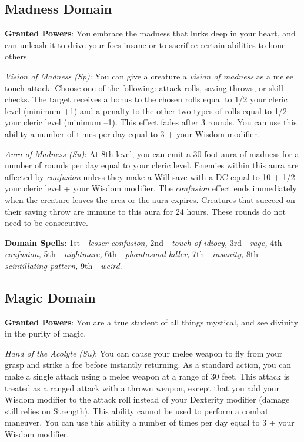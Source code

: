 \subsection{Madness Domain}

				
\textbf{Granted Powers}: You embrace the madness that lurks deep in your heart, and can unleash it to drive your foes insane or to sacrifice certain abilities to hone others.
				
\textit{Vision of Madness (Sp)}: You can give a creature a \textit{vision of madness} as a melee touch attack. Choose one of the following: attack rolls, saving throws, or skill checks. The target receives a bonus to the chosen rolls equal to 1/2 your cleric level (minimum +1) and a penalty to the other two types of rolls equal to 1/2 your cleric level (minimum --1). This effect fades after 3 rounds. You can use this ability a number of times per day equal to 3 + your Wisdom modifier.
				
\textit{Aura of Madness (Su)}: At 8th level, you can emit a 30-foot aura of madness for a number of rounds per day equal to your cleric level. Enemies within this aura are affected by \textit{confusion} unless they make a Will save with a DC equal to 10 + 1/2 your cleric level + your Wisdom modifier. The \textit{confusion }effect ends immediately when the creature leaves the area or the aura expires. Creatures that succeed on their saving throw are immune to this aura for 24 hours. These rounds do not need to be consecutive.
				
\textbf{Domain Spells}: 1st---\textit{lesser confusion, }2nd---\textit{touch of idiocy,} 3rd---\textit{rage, }4th---\textit{confusion, }5th---\textit{nightmare, }6th---\textit{phantasmal killer, }7th---\textit{insanity, }8th---\textit{scintillating pattern, }9th---\textit{weird}.
				
\subsection{Magic Domain}

				
\textbf{Granted Powers}: You are a true student of all things mystical, and see divinity in the purity of magic.
				
\textit{Hand of the Acolyte (Su)}: You can cause your melee weapon to fly from your grasp and strike a foe before instantly returning. As a standard action, you can make a single attack using a melee weapon at a range of 30 feet. This attack is treated as a ranged attack with a thrown weapon, except that you add your Wisdom modifier to the attack roll instead of your Dexterity modifier (damage still relies on Strength). This ability cannot be used to perform a combat maneuver. You can use this ability a number of times per day equal to 3 + your Wisdom modifier.
				
